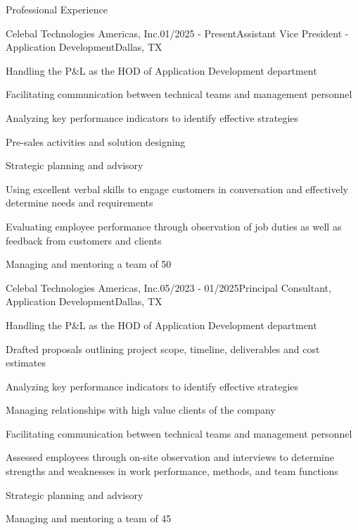 \documentclass{resume} %
\begin{document}
    \begin{rSection}{Professional Experience}
        
        \begin{rSubsection}{Celebal Technologies Americas, Inc.}{01/2025 - Present}{Assistant Vice President - Application Development}{Dallas, TX}
            \item Handling the P\&L as the HOD of Application Development department
            \item Facilitating communication between technical teams and management personnel
            \item Analyzing key performance indicators to identify effective strategies
            \item Pre-sales activities and solution designing
            \item Strategic planning and advisory
            \item Using excellent verbal skills to engage customers in conversation and effectively determine needs and requirements
            \item Evaluating employee performance through observation of job duties as well as feedback from customers and clients
            \item Managing and mentoring a team of 50
        \end{rSubsection}
        
        \begin{rSubsection}{Celebal Technologies Americas, Inc.}{05/2023 - 01/2025}{Principal Consultant, Application Development}{Dallas, TX}
            \item Handling the P\&L as the HOD of Application Development department
            \item Drafted proposals outlining project scope, timeline, deliverables and cost estimates
            \item Analyzing key performance indicators to identify effective strategies
            \item Managing relationships with high value clients of the company
            \item Facilitating communication between technical teams and management personnel
            \item Assessed employees through on-site observation and interviews to determine strengths and weaknesses in work performance, methods, and team functions
            \item Strategic planning and advisory
            \item Managing and mentoring a team of 45
        \end{rSubsection}


\end{rSection}
\end{document}
